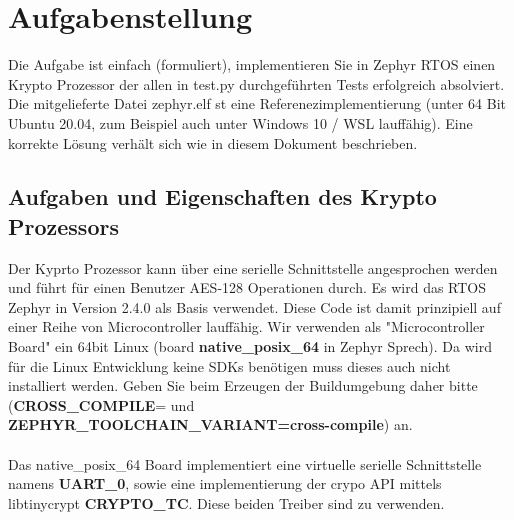 \newpage
\section{Aufgabenstellung}
    Die Aufgabe ist einfach (formuliert), implementieren Sie in Zephyr RTOS einen Krypto Prozessor der allen in test.py durchgeführten
    Tests erfolgreich absolviert.
    Die mitgelieferte Datei zephyr.elf st eine Referenezimplementierung (unter 64 Bit Ubuntu 20.04, zum Beispiel auch unter Windows
    10 / WSL lauffähig). Eine korrekte Lösung verhält sich wie in diesem Dokument beschrieben.
    

\subsection{Aufgaben und Eigenschaften des Krypto Prozessors}
    Der Kyprto Prozessor kann über eine serielle Schnittstelle angesprochen werden und führt für einen Benutzer AES-128 Operationen
    durch. Es wird das RTOS Zephyr in Version 2.4.0 als Basis verwendet. Diese Code ist damit prinzipiell auf einer Reihe von
    Microcontroller lauffähig. Wir verwenden als "Microcontroller Board" ein 64bit Linux (board \textbf{native\_posix\_64} in Zephyr Sprech). Da
    wird für die Linux Entwicklung keine SDKs benötigen muss dieses auch nicht installiert werden. Geben Sie beim Erzeugen der
    Buildumgebung daher bitte (\textbf{CROSS\_COMPILE}= und \textbf{ZEPHYR\_TOOLCHAIN\_VARIANT=cross-compile}) an.
    \\
    \\
    Das native\_posix\_64 Board implementiert eine virtuelle serielle Schnittstelle namens \textbf{UART\_0}, sowie eine implementierung der
    crypo API mittels libtinycrypt \textbf{CRYPTO\_TC}. Diese beiden Treiber sind zu verwenden.
